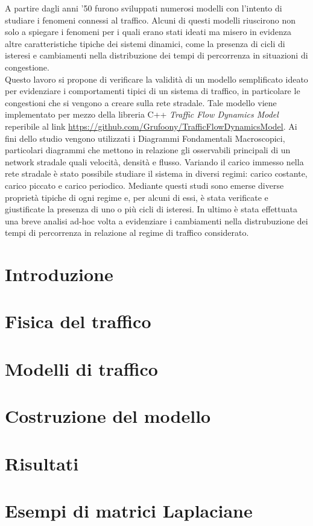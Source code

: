 \documentclass[12pt,a4paper]{report}
\begin{document}
A partire dagli anni '50 furono sviluppati numerosi modelli con l'intento di studiare i fenomeni connessi al traffico.
Alcuni di questi modelli riuscirono non solo a spiegare i fenomeni per i quali erano stati ideati ma misero in evidenza altre caratteristiche tipiche dei sistemi dinamici, come la presenza di cicli di isteresi e cambiamenti nella distribuzione dei tempi di percorrenza in situazioni di congestione.\\
Questo lavoro si propone di verificare la validit\`a di un modello semplificato ideato per evidenziare i comportamenti tipici di un sistema di traffico, in particolare le congestioni che si vengono a creare sulla rete stradale.
Tale modello viene implementato per mezzo della libreria C++ \emph{Traffic Flow Dynamics Model} reperibile al link \url{https://github.com/Grufoony/TrafficFlowDynamicsModel}.
Ai fini dello studio vengono utilizzati i Diagrammi Fondamentali Macroscopici, particolari diagrammi che mettono in relazione gli osservabili principali di un network stradale quali velocit\`a, densit\`a e flusso.
Variando il carico immesso nella rete stradale \`e stato possibile studiare il sistema in diversi regimi: carico costante, carico piccato e carico periodico.
Mediante questi studi sono emerse diverse propriet\`a tipiche di ogni regime e, per alcuni di essi, \`e stata verificate e giustificate la presenza di uno o pi\`u cicli di isteresi.
In ultimo \`e stata effettuata una breve analisi ad-hoc volta a evidenziare i cambiamenti nella distrubuzione dei tempi di percorrenza in relazione al regime di traffico considerato.

\tableofcontents
\listoffigures

\chapter*{Introduzione}


\chapter{Fisica del traffico}


\chapter{Modelli di traffico}


\chapter{Costruzione del modello}


\chapter{Risultati}


\appendix

\chapter{Esempi di matrici Laplaciane}
\label{appendix:laplacian}


\printbibliography
\end{document}
